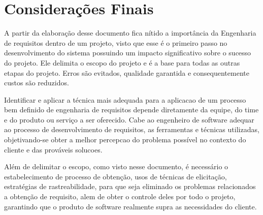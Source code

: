\chapter[Considerações Finais]{Considerações Finais}\label{cap1}
  A partir da elaboração desse documento fica nítido a importância da Engenharia de requisitos dentro de um projeto, visto que esse é o primeiro passo no desenvolvimento do sistema possuindo um impacto significativo sobre o sucesso do projeto. Ele delimita o escopo do projeto e é a base para todas as outras etapas do projeto. Erros são evitados, qualidade garantida e  consequentemente custos são reduzidos.  

  Identificar e aplicar a técnica mais adequada para a aplicacao de um processo bem definido de engenharia de requisitos depende diretamente da equipe, do time e do produto ou serviço a ser oferecido. Cabe ao engenheiro de software adequar ao processo de desenvolvimento de requisitos, as ferramentas e técnicas utilizadas, objetivando-se obter a melhor percepcao do problema possível no contexto do cliente e das prováveis solucoes.

  Além de delimitar o escopo, como visto nesse documento, é necessário o estabelecimento de processo de obtenção, usos de técnicas de elicitação, estratégias de rastreabilidade, para que seja eliminado os problemas relacionados a obtenção de requisito, alem de obter o controle deles por todo o projeto, garantindo que o produto de software realmente supra as necessidades do cliente.
